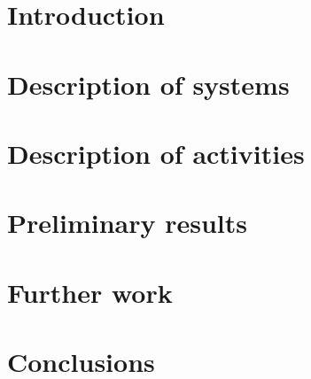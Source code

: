 \section{Introduction}

\section{Description of systems}

\section{Description of activities}

\section{Preliminary results}

\section{Further work}

\section{Conclusions}

